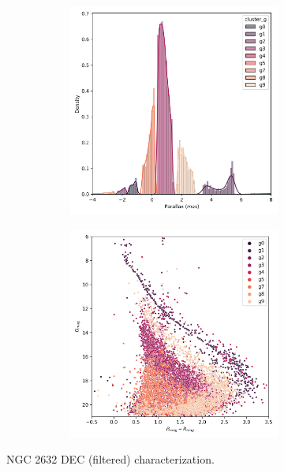 \documentclass[11pt, a4paper, english]{book}
\begin{document}
\begin{figure}[H]
\begin{subfigure}{0.9\textwidth}
\begin{subfigure}[t]{0.30\textwidth}
    \end{subfigure}
    \hfill
    \begin{subfigure}[t]{0.30\textwidth}
      \centering
      \includegraphics[width=\textwidth]{../figures/ngc_2632/dec_parallax_filtered_ngc_2632.png}
    \end{subfigure}
    \hfill
    \begin{subfigure}[t]{0.30\textwidth}
      \centering
      \includegraphics[width=\textwidth]{../figures/ngc_2632/dec_hr_diagram_filtered_ngc_2632.png}
    \end{subfigure}
  \end{subfigure}
  \caption{NGC 2632 DEC (filtered) characterization.}
\end{figure}
\end{document}
